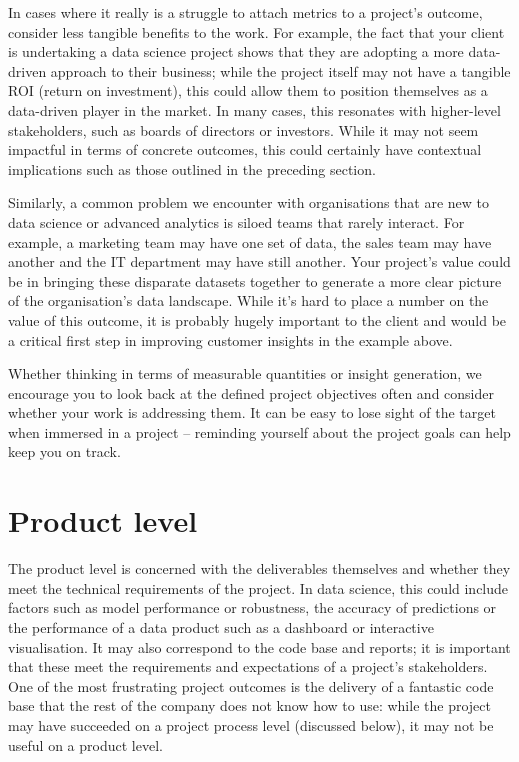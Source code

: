 \documentclass[
]{book}
\begin{document}
In cases where it really is a struggle to attach metrics to a project's
outcome, consider less tangible benefits to the work. For example, the
fact that your client is undertaking a data science project shows that
they are adopting a more data-driven approach to their business; while
the project itself may not have a tangible ROI (return on investment),
this could allow them to position themselves as a data-driven player in
the market. In many cases, this resonates with higher-level
stakeholders, such as boards of directors or investors. While it may not
seem impactful in terms of concrete outcomes, this could certainly have
contextual implications such as those outlined in the preceding section.

Similarly, a common problem we encounter with organisations that are new
to data science or advanced analytics is siloed teams that rarely
interact. For example, a marketing team may have one set of data, the
sales team may have another and the IT department may have still
another. Your project's value could be in bringing these disparate
datasets together to generate a more clear picture of the organisation's
data landscape. While it's hard to place a number on the value of this
outcome, it is probably hugely important to the client and would be a
critical first step in improving customer insights in the example above.

Whether thinking in terms of measurable quantities or insight
generation, we encourage you to look back at the defined project
objectives often and consider whether your work is addressing them. It
can be easy to lose sight of the target when immersed in a project --
reminding yourself about the project goals can help keep you on track.

\hypertarget{product-level}{%
\section{Product level}\label{product-level}}

The product level is concerned with the deliverables themselves and
whether they meet the technical requirements of the project. In data
science, this could include factors such as model performance or
robustness, the accuracy of predictions or the performance of a data
product such as a dashboard or interactive visualisation. It may also
correspond to the code base and reports; it is important that these meet
the requirements and expectations of a project's stakeholders. One of
the most frustrating project outcomes is the delivery of a fantastic
code base that the rest of the company does not know how to use: while
the project may have succeeded on a project process level (discussed
below), it may not be useful on a product level.
\end{document}
